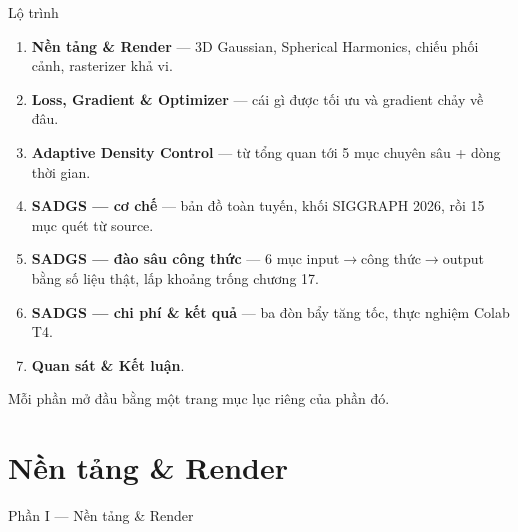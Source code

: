 
\begin{frame}
\titlepage
\end{frame}

\begin{frame}{Lộ trình}
\footnotesize
\begin{enumerate}\setlength{\itemsep}{3pt}
    \item \textbf{Nền tảng \& Render} --- 3D Gaussian, Spherical Harmonics, chiếu phối cảnh, rasterizer khả vi.
    \item \textbf{Loss, Gradient \& Optimizer} --- cái gì được tối ưu và gradient chảy về đâu.
    \item \textbf{Adaptive Density Control} --- từ tổng quan tới 5 mục chuyên sâu + dòng thời gian.
    \item \textbf{SADGS --- cơ chế} --- bản đồ toàn tuyến, khối SIGGRAPH 2026, rồi 15 mục quét từ source.
    \item \textbf{SADGS --- đào sâu công thức} --- 6 mục input$\to$công thức$\to$output bằng số liệu thật, lấp khoảng trống chương 17.
    \item \textbf{SADGS --- chi phí \& kết quả} --- ba đòn bẩy tăng tốc, thực nghiệm Colab T4.
    \item \textbf{Quan sát \& Kết luận}.
\end{enumerate}
\vspace{2mm}
\scriptsize Mỗi phần mở đầu bằng một trang mục lục riêng của phần đó.
\end{frame}

\part{Nền tảng \& Render}
\begin{frame}{Phần I --- Nền tảng \& Render}
\small
\tableofcontents
\end{frame}

